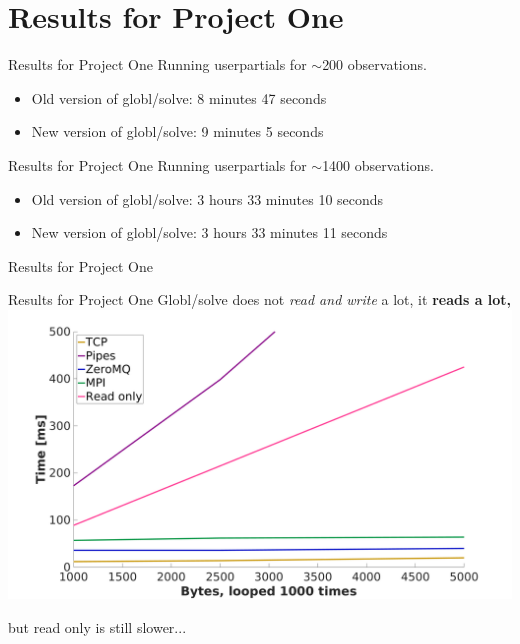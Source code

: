 \documentclass{beamer}
\begin{document}

    \section{Results for Project One}

    \begin{frame}{Results for Project One}
        Running userpartials for $\sim$200 observations.
        \pause
        \begin{itemize}[<+-|alert@+>]
            \item Old version of globl/solve: 8 minutes 47 seconds
            \item New version of globl/solve: 9 minutes 5 seconds
        \end{itemize}
    \end{frame}
     \begin{frame}{Results for Project One}
        Running userpartials for $\sim$1400 observations.
        \pause
        \begin{itemize}[<+-|alert@+>]
            \item Old version of globl/solve: 3 hours 33 minutes 10 seconds
            \item New version of globl/solve: 3 hours 33 minutes 11 seconds
        \end{itemize}
    \end{frame}
   \begin{frame}{Results for Project One}
    \end{frame}
    \begin{frame}{Results for Project One}
        Globl/solve does not \emph{read and write} a lot, it \bf{reads} a lot,
        \centering
        \includegraphics[width=1\columnwidth]{thousandrun}

        but read only is still slower...
    \end{frame}
\end{document}
